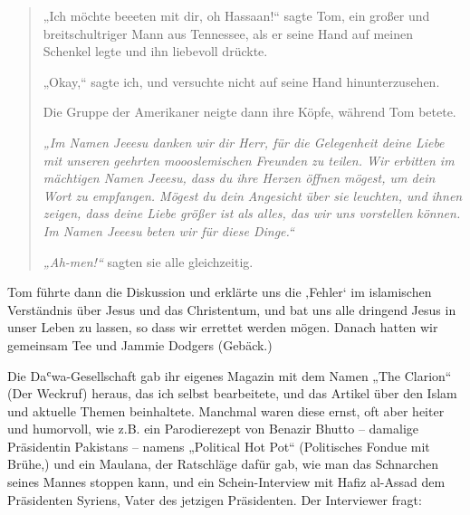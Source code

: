 \documentclass[12pt]{memoir}
\def\`{ʿ} %
\def\–{\hskip0pt-\hskip0pt}
\begin{document}
\begin{quote}
„Ich möchte beeeten mit dir, oh Hassaan!“ sagte Tom,
ein großer und breitschultriger Mann aus Tennessee,
als er seine Hand auf meinen Schenkel legte und ihn liebevoll drückte.

„Okay,“ sagte ich, und versuchte nicht auf seine Hand hinunterzusehen.

Die Gruppe der Amerikaner neigte dann ihre Köpfe, während Tom betete.

\emph{„Im Namen Jeeesu danken wir dir Herr,
für die Gelegenheit deine Liebe
mit unseren geehrten moooslemischen Freunden zu teilen.
Wir erbitten im mächtigen Namen Jeeesu,
dass du ihre Herzen öffnen mögest, um dein Wort zu empfangen.
Mögest du dein Angesicht über sie leuchten,
und ihnen zeigen, dass deine Liebe größer ist als alles,
das wir uns vorstellen können.
Im Namen Jeeesu beten wir für diese Dinge.“}

\emph{„Ah-men!“} sagten sie alle gleichzeitig.
\end{quote}

Tom führte dann die Diskussion und erklärte uns die ‚Fehler‘
im islamischen Verständnis über Jesus und das Christentum,
und bat uns alle dringend Jesus in unser Leben zu lassen,
so dass wir errettet werden mögen.
Danach hatten wir gemeinsam Tee und Jammie Dodgers (Gebäck.)

Die Da\`wa-Gesellschaft gab ihr eigenes Magazin
mit dem Namen „The Clarion“ (Der Weckruf) heraus,
das ich selbst bearbeitete, und das Artikel
über den Islam und aktuelle Themen beinhaltete.
Manchmal waren diese ernst, oft aber heiter und humorvoll,
wie z.B. ein Parodierezept von Benazir Bhutto –
damalige Präsidentin Pakistans – namens „Political Hot Pot“
(Politisches Fondue mit Brühe,)
und ein Maulana, der Ratschläge dafür gab,
wie man das Schnarchen seines Mannes stoppen kann,
und ein Schein\–Interview mit Hafiz al-Assad dem Präsidenten Syriens,
Vater des jetzigen Präsidenten.
Der Interviewer fragt:
\end{document}
